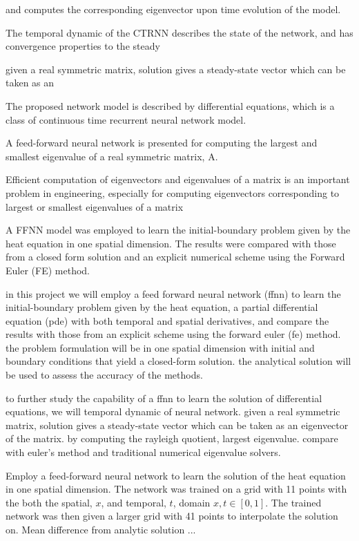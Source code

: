 
and computes the corresponding eigenvector upon time evolution of the model. 

The temporal dynamic of the CTRNN describes the state of the network, and has convergence properties to the steady  

given a real symmetric matrix, solution gives a steady-state vector which can be taken as an

The proposed network model is described by differential equations, which is a class of continuous time recurrent neural network model. 

A feed-forward neural network is presented for computing the largest and smallest eigenvalue of a real symmetric matrix, A.


Efficient computation of eigenvectors and eigenvalues of a matrix is an important problem in engineering, especially for computing eigenvectors corresponding to largest or smallest eigenvalues of a matrix

A FFNN model was employed to learn the initial-boundary problem given by the heat equation in one spatial dimension. The results were compared with those from a closed form solution and an explicit numerical scheme using the Forward Euler (FE) method.

in this project we will employ a feed forward neural network (ffnn) to learn the initial-boundary problem given by the heat equation, a partial differential equation (pde) with both temporal and spatial derivatives, and compare the results with those from an explicit scheme using the forward euler (fe) method. the problem formulation will be in one spatial dimension with initial and boundary conditions that yield a closed-form solution. the analytical solution will be used to assess the accuracy of the methods. 

to further study the capability of a ffnn to learn the solution of differential equations, we will 
temporal dynamic of neural network. given a real symmetric matrix, solution gives a steady-state vector which can be taken as an eigenvector of the matrix. by computing the rayleigh quotient, largest eigenvalue.
compare with euler's method and traditional numerical eigenvalue solvers.


Employ a feed-forward neural network to learn the solution of the heat equation in one spatial dimension. The network was trained on a grid with 11 points with the both the spatial, $x$, and temporal, $t$, domain $x, t \in [0,1]$. The trained network was then given a larger grid with 41 points to interpolate the solution on. Mean difference from analytic solution ...


